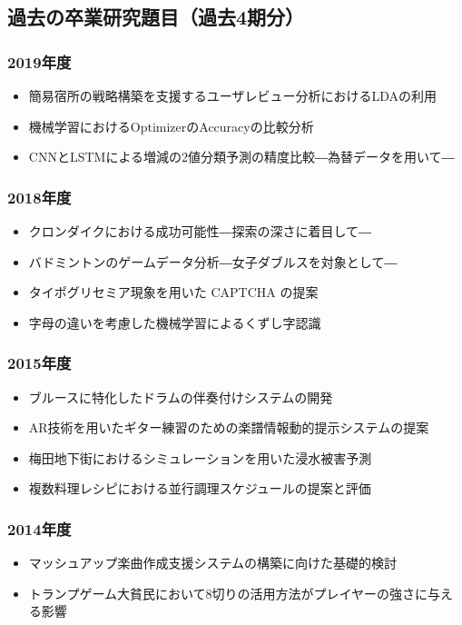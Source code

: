 \documentclass[uplatex,jis2004,a4paper]{jsarticle}
\begin{document}
\subsection*{過去の卒業研究題目（過去4期分）}
\vspace{-.5cm}
\begin{multicols}{2}
{\small
\subsubsection*{2019年度}
\begin{itemize}
  \item 簡易宿所の戦略構築を支援するユーザレビュー分析におけるLDAの利用
  \item 機械学習におけるOptimizerのAccuracyの比較分析
  \item CNNとLSTMによる増減の2値分類予測の精度比較―為替データを用いて― 
\end{itemize}
\subsubsection*{2018年度}
\begin{itemize}
  \item クロンダイクにおける成功可能性―探索の深さに着目して―
  \item バドミントンのゲームデータ分析―女子ダブルスを対象として―
  \item タイポグリセミア現象を用いた CAPTCHA の提案
  \item 字母の違いを考慮した機械学習によるくずし字認識
\end{itemize}
\subsubsection*{2015年度}
\begin{itemize}
  \item ブルースに特化したドラムの伴奏付けシステムの開発
  \item AR技術を用いたギター練習のための楽譜情報動的提示システムの提案
  \item 梅田地下街におけるシミュレーションを用いた浸水被害予測
  \item 複数料理レシピにおける並行調理スケジュールの提案と評価
\end{itemize}
\subsubsection*{2014年度}
\begin{itemize}
  \item マッシュアップ楽曲作成支援システムの構築に向けた基礎的検討
  \item トランプゲーム大貧民において8切りの活用方法がプレイヤーの強さに与える影響
\end{itemize}
\vspace{-.4cm}
}
\end{multicols}
\end{document}
